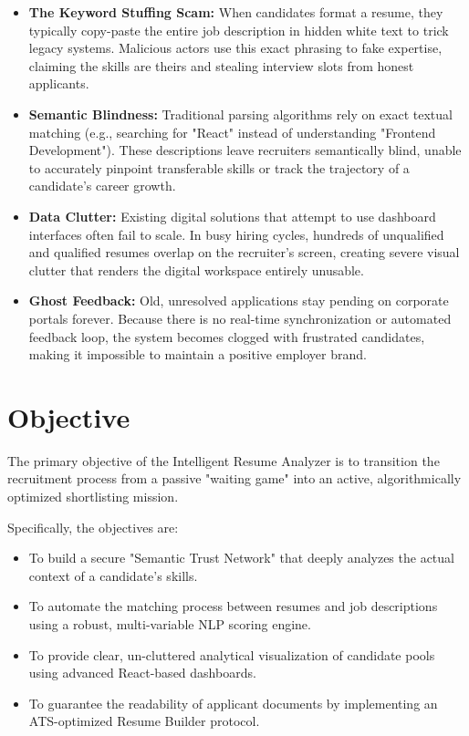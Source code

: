 \documentclass[12pt,a4paper]{report}
\begin{document}
\begin{itemize}
    \item \textbf{The Keyword Stuffing Scam:} When candidates format a resume, they typically copy-paste the entire job description in hidden white text to trick legacy systems. Malicious actors use this exact phrasing to fake expertise, claiming the skills are theirs and stealing interview slots from honest applicants.
    \item \textbf{Semantic Blindness:} Traditional parsing algorithms rely on exact textual matching (e.g., searching for "React" instead of understanding "Frontend Development"). These descriptions leave recruiters semantically blind, unable to accurately pinpoint transferable skills or track the trajectory of a candidate's career growth.
    \item \textbf{Data Clutter:} Existing digital solutions that attempt to use dashboard interfaces often fail to scale. In busy hiring cycles, hundreds of unqualified and qualified resumes overlap on the recruiter's screen, creating severe visual clutter that renders the digital workspace entirely unusable.
    \item \textbf{Ghost Feedback:} Old, unresolved applications stay pending on corporate portals forever. Because there is no real-time synchronization or automated feedback loop, the system becomes clogged with frustrated candidates, making it impossible to maintain a positive employer brand.
\end{itemize}

\section{Objective}

The primary objective of the Intelligent Resume Analyzer is to transition the recruitment process from a passive "waiting game" into an active, algorithmically optimized shortlisting mission. 

Specifically, the objectives are:
\begin{itemize}
    \item To build a secure "Semantic Trust Network" that deeply analyzes the actual context of a candidate's skills.
    \item To automate the matching process between resumes and job descriptions using a robust, multi-variable NLP scoring engine.
    \item To provide clear, un-cluttered analytical visualization of candidate pools using advanced React-based dashboards.
    \item To guarantee the readability of applicant documents by implementing an ATS-optimized Resume Builder protocol.
\end{itemize}
\end{document}
